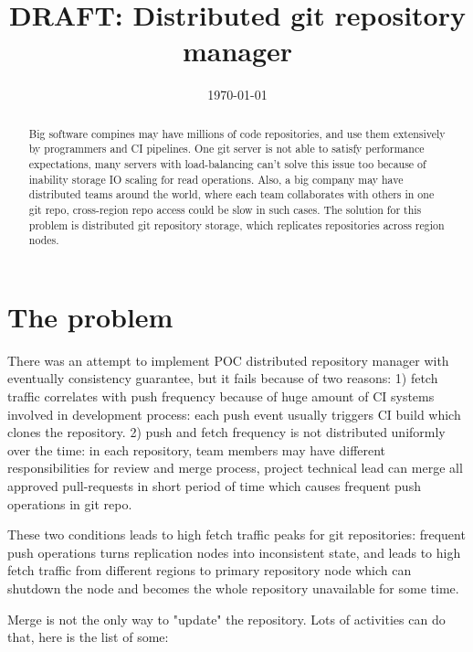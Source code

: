 \documentclass[12pt,oneside]{article}
\date{\small\today}
\title{%
  DRAFT: Distributed git repository manager\\
  \colorbox{firebrick}{\small\sffamily\color{white}{White Paper}}}
\begin{document}
\raggedbottom

\maketitle
\begin{abstract}
Big software compines may have millions of code repositories,
and use them extensively by programmers and CI pipelines.
One git server is not able to satisfy performance expectations,
many servers with load-balancing can't solve this issue too because
of inability storage IO scaling for read operations.
Also, a big company may have distributed teams around the world,
where each team collaborates with others in one git repo,
cross-region repo access could be slow in such cases.
The solution for this problem is distributed git repository storage,
which replicates repositories across region nodes.
\end{abstract}


\section{The problem}

There was an attempt to implement POC distributed repository manager with
eventually consistency guarantee, but it fails because of two reasons:
1) fetch traffic correlates with push frequency because of huge amount of
CI systems involved in development process: each push event usually triggers
CI build which clones the repository.
2) push and fetch frequency is not distributed uniformly over the time: in each
repository, team members may have different responsibilities for review and merge process,
project technical lead can merge all approved pull-requests in short period of time
which causes frequent push operations in git repo.

These two conditions leads to high fetch traffic peaks for git repositories:
frequent push operations turns replication nodes into inconsistent state,
and leads to high fetch traffic from different regions to primary repository node
which can shutdown the node and becomes the whole repository unavailable for some time.

Merge is not the only way to "update" the repository. Lots of activities can do that,
here is the list of some:
\end{document}
